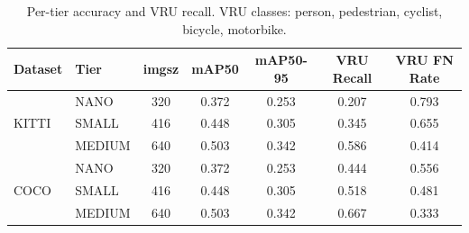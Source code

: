 \begin{table}[t]
\centering
\caption{Per-tier accuracy and VRU recall. VRU classes: person, pedestrian, cyclist, bicycle, motorbike.}
\label{tab:accuracy_per_tier}
\begin{tabular}{llccccc}
\toprule
Dataset & Tier & imgsz & mAP50 & mAP50-95 & VRU Recall & VRU FN Rate \\
\midrule
\multirow{3}{*}{KITTI} & NANO & 320 & 0.372 & 0.253 & 0.207 & 0.793 \\
 & SMALL & 416 & 0.448 & 0.305 & 0.345 & 0.655 \\
 & MEDIUM & 640 & 0.503 & 0.342 & 0.586 & 0.414 \\
\midrule
\multirow{3}{*}{COCO} & NANO & 320 & 0.372 & 0.253 & 0.444 & 0.556 \\
 & SMALL & 416 & 0.448 & 0.305 & 0.518 & 0.481 \\
 & MEDIUM & 640 & 0.503 & 0.342 & 0.667 & 0.333 \\
\bottomrule
\end{tabular}
\end{table}